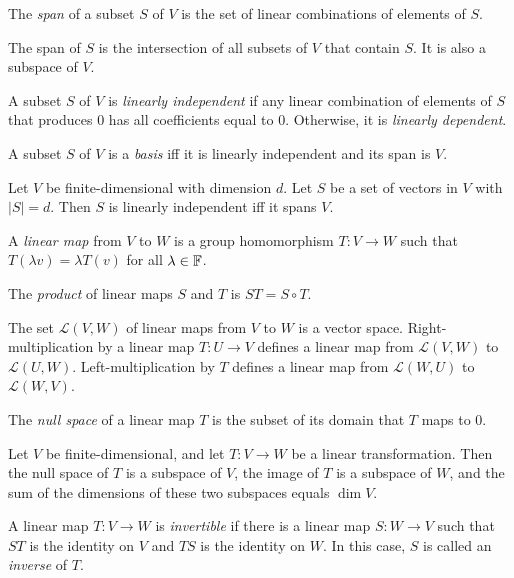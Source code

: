 \begin{defn}
  The \emph{span} of a subset $S$ of $V$ is the set of linear combinations of
  elements of $S$.
\end{defn}
\begin{prop}
  The span of $S$ is the intersection of all subsets of $V$ that contain $S$.
  It is also a subspace of $V$.
\end{prop}
\begin{defn}
  A subset $S$ of $V$ is \emph{linearly independent} if any linear combination
  of elements of $S$ that produces $ 0$ has all coefficients equal to $0$.
  Otherwise, it is \emph{linearly dependent}.
\end{defn}
\begin{prop}
  A subset $S$ of $V$ is a \emph{basis} iff it is linearly independent and its
  span is $V$.
\end{prop}
\begin{prop}
  Let $V$ be finite-dimensional with dimension $d$.
  Let $S$ be a set of vectors in $V$ with $|S|=d$. Then $S$ is linearly
  independent iff it spans $V$.
\end{prop}
\begin{defn}
  A \emph{linear map} from $V$ to $W$ is a group homomorphism
  $T:V\to W$ such that $T(\lambda v)=\lambda T(v)$ for all $\lambda\in\mathbb{F}$.

  The \emph{product} of linear maps $S$ and $T$ is $ST=S\circ T$.
\end{defn}
\begin{prop}
  The set $\mathcal L(V,W)$ of linear maps from $V$ to $W$ is a vector space.
  Right-multiplication by a linear map $T:U\to V$ defines a linear map from $\mathcal
  L(V,W)$ to $\mathcal L(U,W)$. Left-multiplication by $T$ defines a linear map
  from $\mathcal L(W,U)$ to $\mathcal L(W,V)$.
\end{prop}
\begin{defn}
  The \emph{null space} of a linear map $T$ is the subset of its domain that $T$
  maps to 0.
\end{defn}
\begin{prop}
  Let $V$ be finite-dimensional, and
  let $T:V\to W$ be a linear transformation. Then the null space of $T$ is a
  subspace of $V$, the image of $T$ is a subspace of $W$, and the sum of the
  dimensions of these two subspaces equals $\dim V$.
\end{prop}
\begin{defn}
  A linear map $T:V\to W$ is \emph{invertible} if there is a linear map $S:W\to
  V$ such that $ST$ is the identity on $V$ and $TS$ is the identity on $W$. In
  this case, $S$ is called an \emph{inverse} of $T$.
\end{defn}
